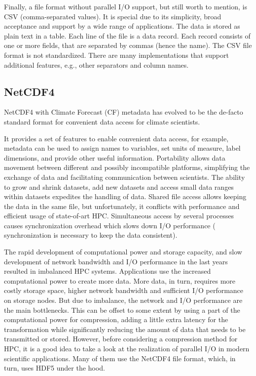 Finally, a file format without parallel I/O support, but still worth to mention, is CSV (comma-separated values).
It is special due to its simplicity, broad acceptance and support by a wide range of applications.
The data is stored as plain text in a table.
Each line of the file is a data record.
Each record consists of one or more fields, that are separated by commas (hence the name).
The CSV file format is not standardized.
There are many implementations that support additional features, e.g., other separators and column names.



\subsection{NetCDF4}

NetCDF4 with Climate Forecast (CF) metadata has evolved to be the de-facto standard format for convenient data access for climate scientists.

It provides a set of features to enable convenient data access, for example, metadata can be used to assign names to variables, set units of measure, label dimensions, and provide other useful information.
Portability allows data movement between different and possibly incompatible platforms, simplifying the exchange of data and facilitating communication between scientists.
The ability to grow and shrink datasets, add new datasets and access small data ranges within datasets expedites the handling of data.
Shared file access allows keeping the data in the same file, but
unfortunately, it conflicts with performance and efficient usage of state-of-art HPC.
Simultaneous access by several processes causes synchronization overhead which slows down I/O performance (
synchronization is necessary to keep the data consistent).

The rapid development of computational power and storage capacity, and slow development of network bandwidth and I/O performance in the last years resulted in imbalanced HPC systems.
Applications use the increased computational power to create more data.
More data, in turn, requires more costly storage space, higher network bandwidth and sufficient I/O performance on storage nodes.
But due to imbalance, the network and I/O performance are the main bottlenecks.
This can be offset to some extent by using a part of the computational power for compression, adding a little extra latency for the transformation while significantly reducing the amount of data that needs to be transmitted or stored.
However, before considering a compression method for HPC, it is a good idea to take a look at the realization of parallel I/O in modern scientific applications.
Many of them use the NetCDF4 file format, which, in turn, uses HDF5 under the hood.

